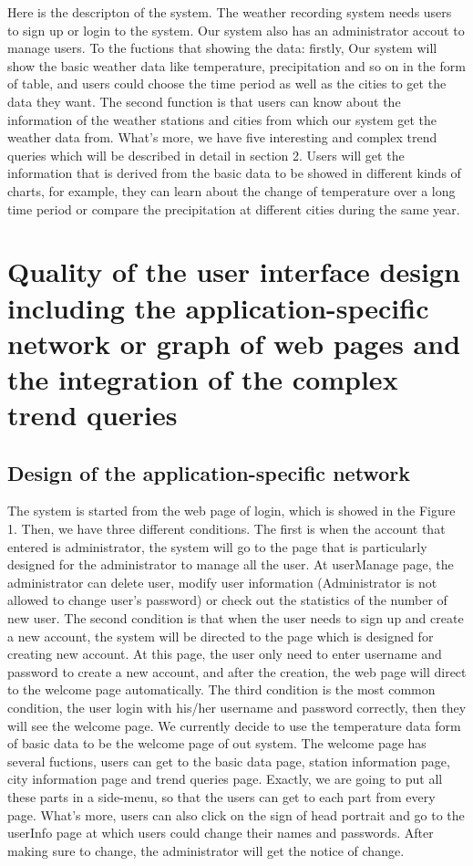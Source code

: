 \documentclass[]{article}
\begin{document}
	\noindent Here is the descripton of the system. The weather recording system needs users to sign up or login to the system. Our system also has an administrator accout to manage users. To the fuctions that showing the data: firstly, Our system will show the basic weather data like temperature, precipitation and so on in the form of table, and users could choose the time period as well as the cities to get the data they want. The second function is that users can know about the information of the weather stations and cities from which our system get the weather data from. What's more, we have five interesting and complex trend queries which will be described in detail in section 2. Users will get the information that is derived from the basic data to be showed in different kinds of charts, for example, they can learn about the change of temperature over a long time period or compare the precipitation at different cities during the same year. 
	
	\clearpage
	
	\section{Quality of the user interface design including the application-specific network or graph of web pages and the  integration of the complex trend queries}
	
	\subsection{Design of the application-specific network}
	
	The system is started from the web page of login, which is showed in the Figure 1. Then, we have three different conditions. The first is when the account that entered is administrator, the system will go to the page that is particularly designed for the administrator to manage all the user. At userManage page, the administrator can delete user, modify user information (Administrator is not allowed to change user's password) or check out the statistics of the number of new user. The second condition is that when the user needs to sign up and create a new account, the system will be directed to the page which is designed for creating new account. At this page, the user only need to enter username and password to create a new account, and after the creation, the web page will direct to the welcome page automatically. The third condition is the most common condition, the user login with his/her username and password correctly, then they will see the welcome page. We currently decide to use the temperature data form of basic data to be the welcome page of out system. The welcome page has several fuctions, users can get to the basic data page, station information page, city information page and trend queries page. Exactly, we are going to put all these parts in a side-menu, so that the users can get to each part from every page. What's more, users can also click on the sign of head portrait and go to the userInfo page at which users could change their names and passwords. After making sure to change, the administrator will get the notice of change.
	
\end{document}
